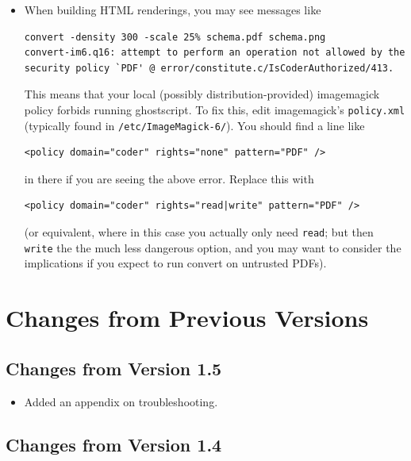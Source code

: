 \documentclass[11pt,a4paper]{ivoa}
\begin{document}
\begin{itemize}
\item When building HTML renderings, you may see messages like
\begin{lstlisting}
convert -density 300 -scale 25% schema.pdf schema.png
convert-im6.q16: attempt to perform an operation not allowed by the
security policy `PDF' @ error/constitute.c/IsCoderAuthorized/413.
\end{lstlisting}

This means that your local (possibly distribution-provided) imagemagick
policy forbids running ghostscript.  To fix this, edit imagemagick's
\verb|policy.xml| (typically found in \verb|/etc/ImageMagick-6/|).  You
should find a line like

\begin{lstlisting}
<policy domain="coder" rights="none" pattern="PDF" />
\end{lstlisting}

in there if you are seeing the above error.  Replace this with

\begin{lstlisting}
<policy domain="coder" rights="read|write" pattern="PDF" />
\end{lstlisting}

(or equivalent, where in this case you actually only need \verb|read|;
but then \verb|write| the the much less dangerous option, and you may
want to consider the implications if you expect to run convert on
untrusted PDFs).

\end{itemize}

\section{Changes from Previous Versions}

\subsection{Changes from Version 1.5}

\begin{itemize}
\item Added an appendix on troubleshooting.
\end{itemize}

\subsection{Changes from Version 1.4}
\end{document}
